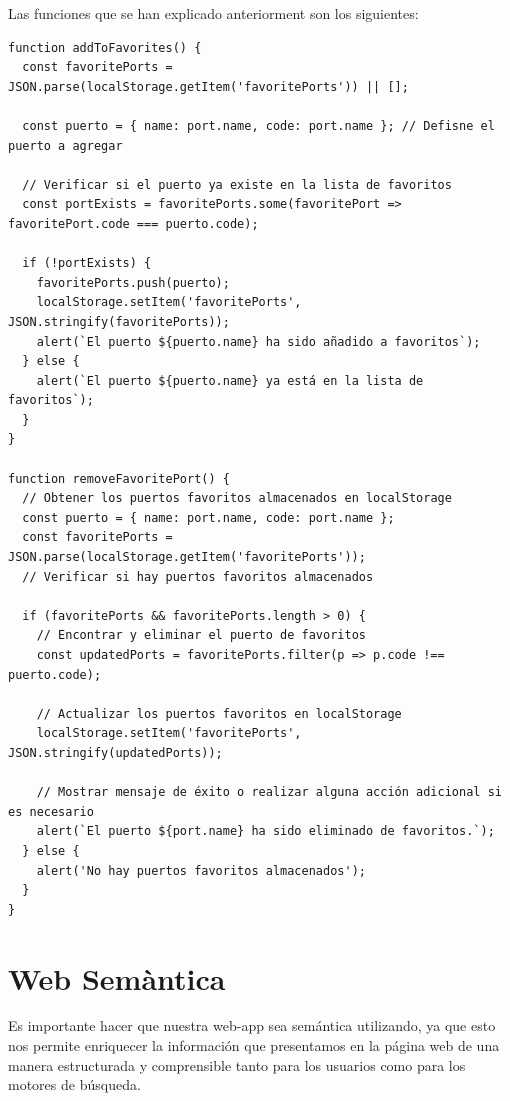 \documentclass{article}
\begin{document}
Las funciones que se han explicado anteriorment son los siguientes:
\begin{verbatim}
function addToFavorites() {
  const favoritePorts = JSON.parse(localStorage.getItem('favoritePorts')) || [];

  const puerto = { name: port.name, code: port.name }; // Defisne el puerto a agregar

  // Verificar si el puerto ya existe en la lista de favoritos
  const portExists = favoritePorts.some(favoritePort => favoritePort.code === puerto.code);

  if (!portExists) {
    favoritePorts.push(puerto);
    localStorage.setItem('favoritePorts', JSON.stringify(favoritePorts));
    alert(`El puerto ${puerto.name} ha sido añadido a favoritos`);
  } else {
    alert(`El puerto ${puerto.name} ya está en la lista de favoritos`);
  }
}

function removeFavoritePort() {
  // Obtener los puertos favoritos almacenados en localStorage
  const puerto = { name: port.name, code: port.name };
  const favoritePorts = JSON.parse(localStorage.getItem('favoritePorts'));
  // Verificar si hay puertos favoritos almacenados
  
  if (favoritePorts && favoritePorts.length > 0) {
    // Encontrar y eliminar el puerto de favoritos
    const updatedPorts = favoritePorts.filter(p => p.code !== puerto.code);

    // Actualizar los puertos favoritos en localStorage
    localStorage.setItem('favoritePorts', JSON.stringify(updatedPorts));

    // Mostrar mensaje de éxito o realizar alguna acción adicional si es necesario
    alert(`El puerto ${port.name} ha sido eliminado de favoritos.`);
  } else {
    alert('No hay puertos favoritos almacenados');
  }
}
\end{verbatim}

\section{Web Semàntica}
Es importante hacer que nuestra web-app sea semántica utilizando, ya que esto nos permite enriquecer la información que presentamos en la página web de una manera estructurada y comprensible tanto para los usuarios como para los motores de búsqueda.\\
\end{document}

